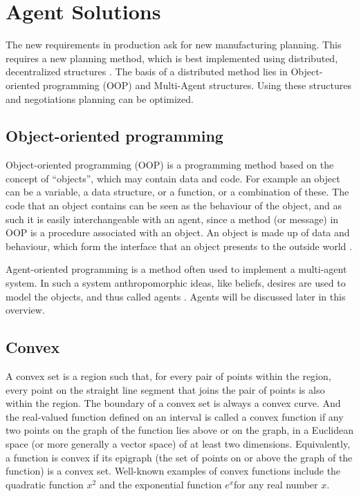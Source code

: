 \section{Agent Solutions}
The new requirements in production ask for new manufacturing planning. This requires a new planning method, which is best implemented using distributed, decentralized structures \citep{parunak1999industrial}. The basis of a distributed method lies in Object-oriented programming (OOP) and Multi-Agent structures. Using these structures and negotiations planning can be optimized.

\subsection{Object-oriented programming}

Object-oriented programming (OOP) is a programming method based on the concept of ``objects'', which may contain data and code. For example an object can be a variable, a data structure, or a function, or a combination of these. The code that an object contains can be seen as the behaviour of the object, and as such it is easily interchangeable with an agent, since a method (or message) in OOP is a procedure associated with an object. An object is made up of data and behaviour, which form the interface that an object presents to the outside world \citep{shoham1993agent}. 

Agent-oriented programming is a method often used to implement a multi-agent system. In such a system anthropomorphic ideas, like beliefs, desires are used to model the objects, and thus called agents \citep{shoham1993agent}. Agents will be discussed later in this overview.%

% 


\subsection{Convex}
\label{sec:convex}
A convex set is a region such that, for every pair of points within the region, every point on the straight line segment that joins the pair of points is also within the region. %
The boundary of a convex set is always a convex curve. And the real-valued function defined on an interval is called a convex function if any two points on the graph of the function lies above or on the graph, in a Euclidean space (or more generally a vector space) of at least two dimensions. Equivalently, a function is convex if its epigraph (the set of points on or above the graph of the function) is a convex set. Well-known examples of convex functions include the quadratic function $x^{2}$ and the exponential function $e^{x} $for any real number $x$.

